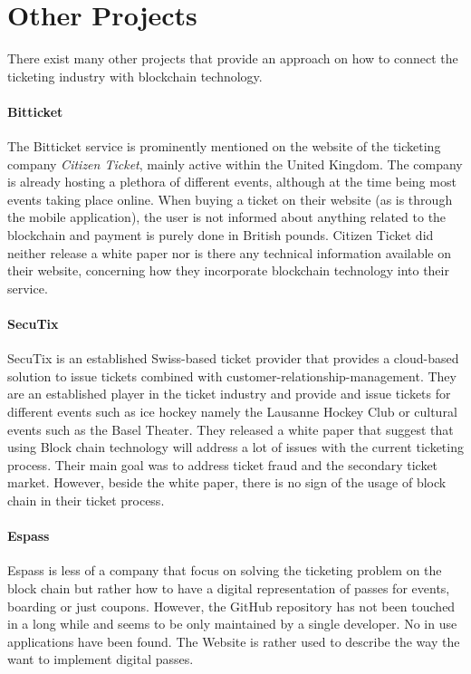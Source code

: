 \section{Other Projects}

There exist many other projects that provide an approach on how to connect the ticketing industry with blockchain technology.

\paragraph{Bitticket}
The Bitticket service\cite{bitticket} is prominently mentioned on the website of the ticketing company \textit{Citizen Ticket}, mainly active within the United Kingdom. The company is already hosting a plethora of different events, although at the time being most events taking place online. When buying a ticket on their website (as is through the mobile application), the user is not informed about anything related to the blockchain and payment is purely done in British pounds. Citizen Ticket did neither release a white paper nor is there any technical information available on their website, concerning how they incorporate blockchain technology into their service.

\paragraph{SecuTix}
SecuTix\cite{SECUTIX} is an established Swiss-based ticket provider that provides a cloud-based solution to issue tickets combined with customer-relationship-management. They are an established player in the ticket industry and provide and issue tickets for different events such as ice hockey namely the Lausanne Hockey Club or cultural events such as the Basel Theater. They released a white paper that suggest that using Block chain technology will address a lot of issues with the current ticketing process. Their main goal was to address ticket fraud and the secondary ticket market. However, beside the white paper, there is no sign of the usage of block chain in their ticket process.

\paragraph{Espass} 
Espass\cite{espass} is less of a company that focus on solving the ticketing problem on the block chain but rather how to have a digital representation of passes for events, boarding or just coupons. However, the GitHub repository has not been touched in a long while and seems to be only maintained by a single developer. No in use applications have been found. The Website is rather used to describe the way the want to implement digital passes.  


